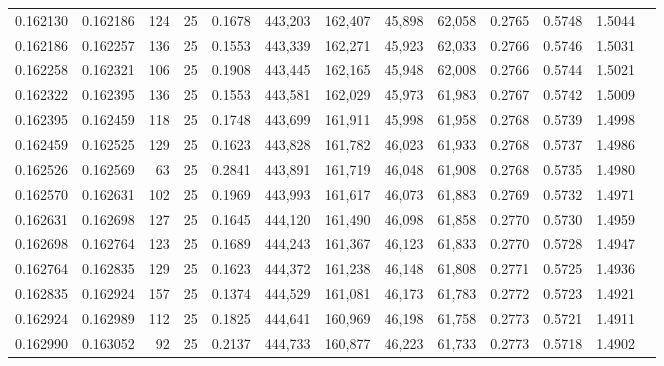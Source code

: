 \begin{tabular}{rrrrrrrrrrrrr}
0.162130 & 0.162186 &   124 &  25 &                                     0.1678 & 443,203 & 162,407 &  45,898 &  62,058 & 0.2765 & 0.5748 & 1.5044 \\
0.162186 & 0.162257 &   136 &  25 &                                     0.1553 & 443,339 & 162,271 &  45,923 &  62,033 & 0.2766 & 0.5746 & 1.5031 \\
0.162258 & 0.162321 &   106 &  25 &                                     0.1908 & 443,445 & 162,165 &  45,948 &  62,008 & 0.2766 & 0.5744 & 1.5021 \\
0.162322 & 0.162395 &   136 &  25 &                                     0.1553 & 443,581 & 162,029 &  45,973 &  61,983 & 0.2767 & 0.5742 & 1.5009 \\
0.162395 & 0.162459 &   118 &  25 &                                     0.1748 & 443,699 & 161,911 &  45,998 &  61,958 & 0.2768 & 0.5739 & 1.4998 \\
0.162459 & 0.162525 &   129 &  25 &                                     0.1623 & 443,828 & 161,782 &  46,023 &  61,933 & 0.2768 & 0.5737 & 1.4986 \\
0.162526 & 0.162569 &    63 &  25 &                                     0.2841 & 443,891 & 161,719 &  46,048 &  61,908 & 0.2768 & 0.5735 & 1.4980 \\
0.162570 & 0.162631 &   102 &  25 &                                     0.1969 & 443,993 & 161,617 &  46,073 &  61,883 & 0.2769 & 0.5732 & 1.4971 \\
0.162631 & 0.162698 &   127 &  25 &                                     0.1645 & 444,120 & 161,490 &  46,098 &  61,858 & 0.2770 & 0.5730 & 1.4959 \\
0.162698 & 0.162764 &   123 &  25 &                                     0.1689 & 444,243 & 161,367 &  46,123 &  61,833 & 0.2770 & 0.5728 & 1.4947 \\
0.162764 & 0.162835 &   129 &  25 &                                     0.1623 & 444,372 & 161,238 &  46,148 &  61,808 & 0.2771 & 0.5725 & 1.4936 \\
0.162835 & 0.162924 &   157 &  25 &                                     0.1374 & 444,529 & 161,081 &  46,173 &  61,783 & 0.2772 & 0.5723 & 1.4921 \\
0.162924 & 0.162989 &   112 &  25 &                                     0.1825 & 444,641 & 160,969 &  46,198 &  61,758 & 0.2773 & 0.5721 & 1.4911 \\
0.162990 & 0.163052 &    92 &  25 &                                     0.2137 & 444,733 & 160,877 &  46,223 &  61,733 & 0.2773 & 0.5718 & 1.4902 \\

\end{tabular}
